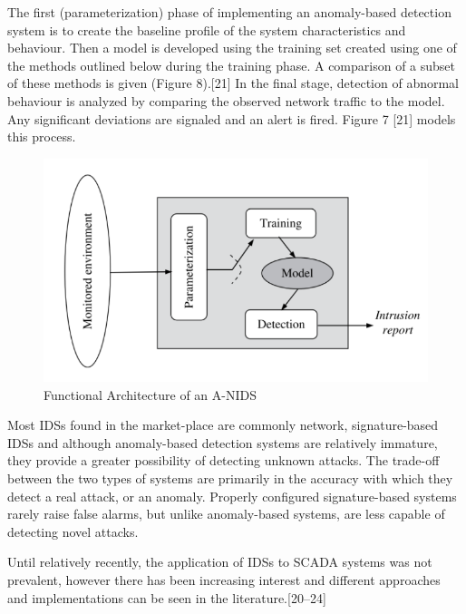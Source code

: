 \documentclass[11pt,]{article}
\begin{document}
The first (parameterization) phase of implementing an anomaly-based
detection system is to create the baseline profile of the system
characteristics and behaviour. Then a model is developed using the
training set created using one of the methods outlined below during the
training phase. A comparison of a subset of these methods is given
(Figure 8).{[}21{]} In the final stage, detection of abnormal behaviour
is analyzed by comparing the observed network traffic to the model. Any
significant deviations are signaled and an alert is fired. Figure 7
{[}21{]} models this process.

\begin{figure}

{\centering \includegraphics{thesis_files/figure-latex/unnamed-chunk-10-1} 

}

\caption{Functional Architecture of an A-NIDS}\label{fig:unnamed-chunk-10}
\end{figure}

Most IDSs found in the market-place are commonly network,
signature-based IDSs and although anomaly-based detection systems are
relatively immature, they provide a greater possibility of detecting
unknown attacks. The trade-off between the two types of systems are
primarily in the accuracy with which they detect a real attack, or an
anomaly. Properly configured signature-based systems rarely raise false
alarms, but unlike anomaly-based systems, are less capable of detecting
novel attacks.

Until relatively recently, the application of IDSs to SCADA systems was
not prevalent, however there has been increasing interest and different
approaches and implementations can be seen in the
literature.{[}20--24{]}

\newpage
\end{document}
